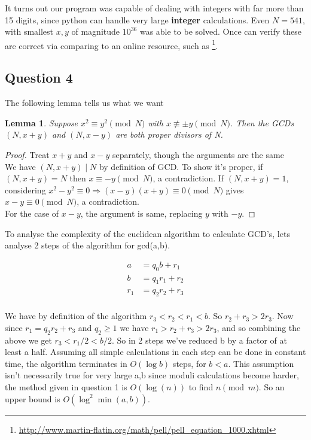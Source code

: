 \documentclass[10pt,a4paper]{report}
\newtheorem*{lemma}{Lemma}
\begin{document}
It turns out our program was capable of dealing with integers with far more than 15 digits, since python can handle very large \textbf{integer} calculations. Even $N=541$, with smallest $x,y$ of magnitude $10^{36}$ was able to be solved. Once can verify these are correct via comparing to an online resource, such as \footnote{\url{http://www.martin-flatin.org/math/pell/pell_equation_1000.xhtml}}.

\subsection*{Question 4}

The following lemma tells us what we want

\begin{lemma}
Suppose $x^2  \equiv y^2 \pmod N$ with $x \not\equiv \pm y \pmod N$. Then the GCDs $(N, x + y)$ and $(N, x - y)$ are both proper divisors of N.
\end{lemma}
\begin{proof}
Treat $x+y$ and $x-y$ separately, though the arguments are the same \\
We have $(N, x+y) \mid N$ by definition of GCD. To show it's proper, if $(N, x+y)=N$ then $x\equiv-y\pmod N$, a contradiction. If $(N, x+y)=1$, considering $x^2-y^2\equiv 0\Rightarrow (x-y)(x+y)\equiv 0 \pmod N$ gives $x-y\equiv0 \pmod N$, a contradiction. \\
For the case of $x-y$, the argument is  same, replacing $y$ with $-y$.
\end{proof}

To analyse the complexity of the euclidean algorithm to calculate GCD's, lets analyse 2 steps of the algorithm for gcd(a,b).

\begin{align*}
a&=q_0b+r_1\\
b&=q_1r_1+r_2\\
r_1&=q_2r_2+r_3\\
\end{align*}

We have by definition of the algorithm $ r_3 < r_2 < r_1 < b$. So $r_2 + r_3 > 2r_3$. Now since $r_1=q_2r_2+r_3$ and $q_2\geq 1$ we have $r_1 > r_2 + r_3 > 2r_3$, and so combining the above we get $r_3 < r_1/2 < b/2$. So in 2 steps we've reduced b by a factor of at least a half. Assuming all simple calculations in each step can be done in constant time, the algorithm terminates in $O(\log{b})$ steps, for $b<a$. This assumption isn't necessarily true for very large a,b since moduli calculations become harder, the method given in question 1 is $O(\log(n))$ to find $n \pmod m$. So an upper bound is  $O(\log^2{\min(a,b)})$.\\
\end{document}

